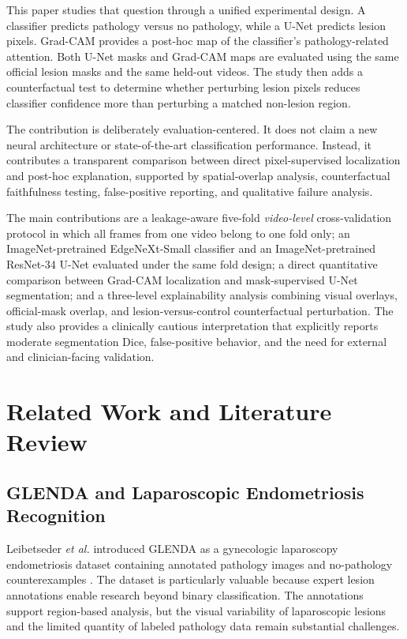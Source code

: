 This paper studies that question through a unified experimental design. A classifier predicts pathology versus no pathology, while a U-Net predicts lesion pixels. Grad-CAM provides a post-hoc map of the classifier's pathology-related attention. Both U-Net masks and Grad-CAM maps are evaluated using the same official lesion masks and the same held-out videos. The study then adds a counterfactual test to determine whether perturbing lesion pixels reduces classifier confidence more than perturbing a matched non-lesion region.

The contribution is deliberately evaluation-centered. It does not claim a new neural architecture or state-of-the-art classification performance. Instead, it contributes a transparent comparison between direct pixel-supervised localization and post-hoc explanation, supported by spatial-overlap analysis, counterfactual faithfulness testing, false-positive reporting, and qualitative failure analysis.

The main contributions are a leakage-aware five-fold \emph{video-level} cross-validation protocol in which all frames from one video belong to one fold only; an ImageNet-pretrained EdgeNeXt-Small classifier and an ImageNet-pretrained ResNet-34 U-Net evaluated under the same fold design; a direct quantitative comparison between Grad-CAM localization and mask-supervised U-Net segmentation; and a three-level explainability analysis combining visual overlays, official-mask overlap, and lesion-versus-control counterfactual perturbation. The study also provides a clinically cautious interpretation that explicitly reports moderate segmentation Dice, false-positive behavior, and the need for external and clinician-facing validation.

\section{Related Work and Literature Review}

\subsection{GLENDA and Laparoscopic Endometriosis Recognition}

Leibetseder \emph{et al.} introduced GLENDA as a gynecologic laparoscopy endometriosis dataset containing annotated pathology images and no-pathology counterexamples \cite{leibetseder2020glenda}. The dataset is particularly valuable because expert lesion annotations enable research beyond binary classification. The annotations support region-based analysis, but the visual variability of laparoscopic lesions and the limited quantity of labeled pathology data remain substantial challenges.

